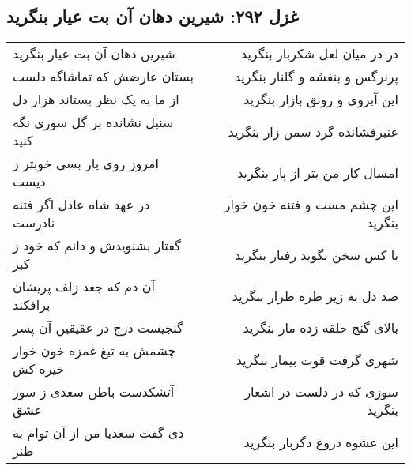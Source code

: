 \begin{center}
\section*{غزل ۲۹۲: شیرین دهان آن بت عیار بنگرید}
\label{sec:292}
\begin{longtable}{l p{0.5cm} r}
شیرین دهان آن بت عیار بنگرید
&&
در در میان لعل شکربار بنگرید
\\
بستان عارضش که تماشاگه دلست
&&
پرنرگس و بنفشه و گلنار بنگرید
\\
از ما به یک نظر بستاند هزار دل
&&
این آبروی و رونق بازار بنگرید
\\
سنبل نشانده بر گل سوری نگه کنید
&&
عنبرفشانده گرد سمن زار بنگرید
\\
امروز روی یار بسی خوبتر ز دیست
&&
امسال کار من بتر از پار بنگرید
\\
در عهد شاه عادل اگر فتنه نادرست
&&
این چشم مست و فتنه خون خوار بنگرید
\\
گفتار بشنویدش و دانم که خود ز کبر
&&
با کس سخن نگوید رفتار بنگرید
\\
آن دم که جعد زلف پریشان برافکند
&&
صد دل به زیر طره طرار بنگرید
\\
گنجیست درج در عقیقین آن پسر
&&
بالای گنج حلقه زده مار بنگرید
\\
چشمش به تیغ غمزه خون خوار خیره کش
&&
شهری گرفت قوت بیمار بنگرید
\\
آتشکدست باطن سعدی ز سوز عشق
&&
سوزی که در دلست در اشعار بنگرید
\\
دی گفت سعدیا من از آن توام به طنز
&&
این عشوه دروغ دگربار بنگرید
\\
\end{longtable}
\end{center}
